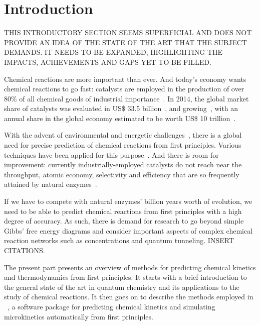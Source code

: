 \chapter{Introduction}%
\label{ch:introduction}

THIS INTRODUCTORY SECTION SEEMS SUPERFICIAL AND DOES NOT PROVIDE AN IDEA OF THE
STATE OF THE ART THAT THE SUBJECT DEMANDS.
IT NEEDS TO BE EXPANDED, HIGHLIGHTING THE IMPACTS, ACHIEVEMENTS AND GAPS YET TO
BE FILLED.

Chemical reactions are more important than ever.
And today's economy wants chemical reactions to go fast:
catalysts are employed in the production of over 80\% of all chemical
goods of industrial
importance~\cite{Breakthrough_Catalyst,GlobalCatalystMarket}.
In 2014, the global market share of catalysts was evaluated in US\$ 33.5
billion~\cite{GlobalCatalystMarket}, and growing~\cite{GlobalCatalystMarket},
with an annual share in the global economy estimated to be worth US\$ 10
trillion~\cite{GlobalCatalystMarket}.

With the advent of environmental and energetic challenges~\cite{Bertozzi_2016},
there is a global need for precise prediction of chemical reactions from first
principles.
Various techniques have been applied for this purpose~\cite{Cao2022}.
And there is room for improvement: currently industrially-employed catalysts do
not reach near the throughput, atomic economy, selectivity and efficiency that
are so frequently attained by natural
enzymes~\cite{Catalysis_in_Chemistry_and_Enzymology}.

If we have to compete with natural enzymes' billion years worth of evolution,
we need to be able to predict chemical reactions from first principles with a
high degree of accuracy.
As such, there is demand for research to go beyond simple Gibbs' free energy
diagrams and consider important aspects of complex chemical reaction networks
such as concentrations and quantum tunneling.
INSERT CITATIONS.

The present part presents an overview of methods for predicting chemical
kinetics and thermodynamics from first principles.
It starts with a brief introduction to the general state of the art in quantum
chemistry and its applications to the study of chemical reactions.
It then goes on to describe the methods employed in
\overreact~\cite{Schneider2022}, a software
package for predicting chemical kinetics and simulating microkinetics
automatically from first principles.
